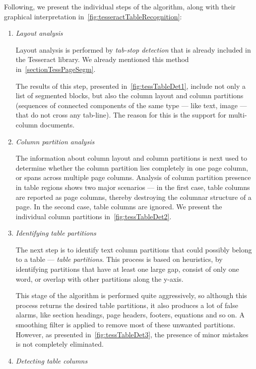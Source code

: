 Following, we present the individual steps of the algorithm, along with their graphical interpretation in~\cref{fig:tesseractTableRecognition}: 

\begin{enumerate}
\item \emph{Layout analysis}

Layout analysis is performed by \emph{tab-stop detection} that is already included in the Tesseract library. We already mentioned this method in~\cref{sectionTessPageSegm}.

The results of this step, presented in~\cref{fig:tessTableDet1}, include not only a list of segmented blocks, but also the column layout and column partitions (sequences of connected components of the same type --- like text, image --- that do not cross any tab-line). The reason for this is the support for multi-column documents.

\item \emph{Column partition analysis}

The information about column layout and column partitions is next used to determine whether the column partition lies completely in one page column, or spans across multiple page columns. Analysis of column partition presence in table regions shows two major scenarios --- in the first case, table columns are reported as page columns, thereby destroying the columnar structure of a page. In the second case, table columns are ignored. We present the individual column partitions in~\cref{fig:tessTableDet2}.

\item \emph{Identifying table partitions}

The next step is to identify text column partitions that could possibly belong to a table --- \emph{table partitions}. This process is based on heuristics, by identifying partitions that have at least one large gap, consist of only one word, or overlap with other partitions along the y-axis.

This stage of the algorithm is performed quite aggressively, so although this process returns the desired table partitions, it also produces a lot of false alarms, like section headings, page headers, footers, equations and so on. A smoothing filter is applied to remove most of these unwanted partitions. However, as presented in~\cref{fig:tessTableDet3}, the presence of minor mistakes is not completely eliminated.

\item \emph{Detecting table columns}


\end{enumerate}
